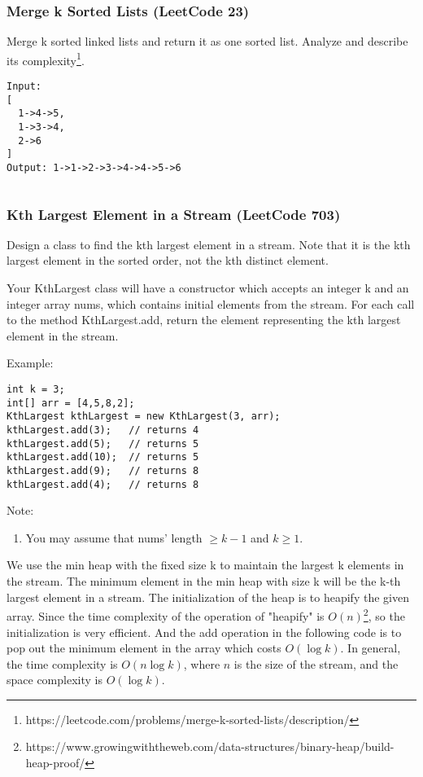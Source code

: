 \documentclass[11pt]{article}
\begin{document}
\subsubsection{Merge k Sorted Lists (LeetCode 23)}
Merge k sorted linked lists and return it as one sorted list. Analyze and describe its complexity\footnote{https://leetcode.com/problems/merge-k-sorted-lists/description/}.

\begin{verbatim}
Input:
[
  1->4->5,
  1->3->4,
  2->6
]
Output: 1->1->2->3->4->4->5->6
\end{verbatim}


\inputminted[breaklines=true,frame=leftline, linenos=true]{python}{src/mergeKSortedLists.py}

\subsubsection{Kth Largest Element in a Stream (LeetCode 703)}
Design a class to find the kth largest element in a stream. Note that it is the kth largest element in the sorted order, not the kth distinct element.

Your KthLargest class will have a constructor which accepts an integer k and an integer array nums, which contains initial elements from the stream. For each call to the method KthLargest.add, return the element representing the kth largest element in the stream.

Example:
\begin{verbatim}
int k = 3;
int[] arr = [4,5,8,2];
KthLargest kthLargest = new KthLargest(3, arr);
kthLargest.add(3);   // returns 4
kthLargest.add(5);   // returns 5
kthLargest.add(10);  // returns 5
kthLargest.add(9);   // returns 8
kthLargest.add(4);   // returns 8
\end{verbatim}

Note: 
\begin{enumerate}
	\item You may assume that nums' length $\geq k-1$  and $k \geq 1$.
\end{enumerate}

We use the min heap with the fixed size k to maintain the largest k elements in the stream. 
The minimum element in the min heap with size k will be the k-th largest element in a stream. 
The initialization of the heap is to heapify the given array.
Since the time complexity of the operation of "heapify" is $O(n)$\footnote{https://www.growingwiththeweb.com/data-structures/binary-heap/build-heap-proof/}, so the initialization is very efficient. 
And the add operation in the following code is to pop out the minimum element in the array which costs $O(\log k)$. 
In general, the time complexity is $O(n\log k)$, where $n$ is the size of the stream, and the space complexity is $O(\log k)$. 
\end{document}
